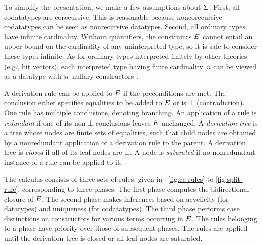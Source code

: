 To simplify the presentation, we make a few assumptions about
$\mathrm{\Sigma}$.
First, all codatatypes %
are corecursive. This is reasonable
because noncorecursive codatatypes can be seen as nonrecursive
datatypes.
Second, all ordinary types have infinite cardinality.
Without quantifiers, the constraints $E$ cannot entail an upper
bound on the cardinality of any uninterpreted type, so it is safe to consider these types
infinite. As for ordinary types interpreted finitely by other theories (e.g.,
bit vectors), each interpreted type having finite cardinality~$n$
can be viewed as a %
datatype with $n$~nullary constructors
\cite{barrett-et-al-2007}.


A derivation rule can be applied to $E$ if %
the %
preconditions are met.
The conclusion either specifies equalities to be added to $E$
or is $\bot$ (contradiction).
One rule has multiple conclusions, %
denoting branching.
%
An application of a rule is \emph{redundant} if one of its non-$\bot$
conclusions leaves $E$ unchanged.
A \emph{derivation tree} is a %
tree whose nodes are finite sets of
equalities, such that child nodes are obtained by a nonredundant application of a
derivation rule to the parent. A derivation tree is \emph{closed} if all of
its leaf nodes are $\bot$. A node is \emph{saturated} if no nonredundant
instance of a rule can be applied to it.

The calculus consists of three sets of rules, given in
\figuresname~\ref{fig:cc-rules} to \ref{fig:split-rule}, corresponding to three
phases. The first phase computes the bidirectional closure of $E$. The second
phase makes inferences based on acyclicity (for datatypes) and uniqueness
(for codatatypes).
The third phase performs case distinctions on constructors for
various terms occurring in $E$.
%
The rules belonging to a phase have priority over those of %
subsequent
phases. The rules are applied until the derivation tree is closed or all leaf nodes
are saturated.

